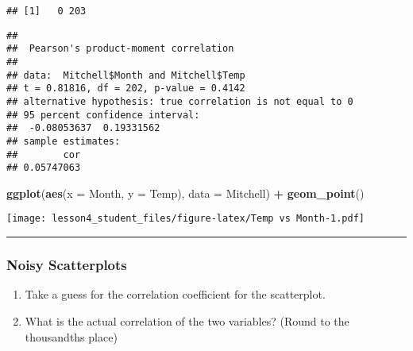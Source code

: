\documentclass[]{article}
\newenvironment{Shaded}{\begin{snugshade}}{\end{snugshade}}
\newcommand{\KeywordTok}[1]{\textcolor[rgb]{0.13,0.29,0.53}{\textbf{#1}}}
\newcommand{\DataTypeTok}[1]{\textcolor[rgb]{0.13,0.29,0.53}{#1}}
\newcommand{\StringTok}[1]{\textcolor[rgb]{0.31,0.60,0.02}{#1}}
\newcommand{\OperatorTok}[1]{\textcolor[rgb]{0.81,0.36,0.00}{\textbf{#1}}}
\newcommand{\NormalTok}[1]{#1}
\begin{document}
\begin{Shaded}
\end{Shaded}

\begin{verbatim}
## [1]   0 203
\end{verbatim}

\begin{Shaded}
\end{Shaded}

\begin{verbatim}
## 
##  Pearson's product-moment correlation
## 
## data:  Mitchell$Month and Mitchell$Temp
## t = 0.81816, df = 202, p-value = 0.4142
## alternative hypothesis: true correlation is not equal to 0
## 95 percent confidence interval:
##  -0.08053637  0.19331562
## sample estimates:
##        cor 
## 0.05747063
\end{verbatim}

\begin{Shaded}
\begin{Highlighting}[]
\KeywordTok{ggplot}\NormalTok{(}\KeywordTok{aes}\NormalTok{(}\DataTypeTok{x =}\NormalTok{ Month, }\DataTypeTok{y =}\NormalTok{ Temp), }\DataTypeTok{data =}\NormalTok{ Mitchell) }\OperatorTok{+}
\StringTok{  }\KeywordTok{geom_point}\NormalTok{()}
\end{Highlighting}
\end{Shaded}

\texttt{[image: lesson4\_student\_files/figure-latex/Temp vs Month-1.pdf]}

\begin{center}\rule{0.5\linewidth}{\linethickness}\end{center}

\subsubsection{Noisy Scatterplots}\label{noisy-scatterplots}

\begin{enumerate}
\def\labelenumi{\alph{enumi}.}
\item
  Take a guess for the correlation coefficient for the scatterplot.
\item
  What is the actual correlation of the two variables? (Round to the
  thousandths place)
\end{enumerate}
\end{document}
